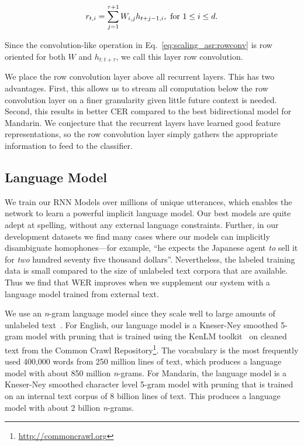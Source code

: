 \begin{align}
\label{eq:scaling_asr:rowconv}
r_{t,i} = \sum_{j=1}^{\tau+1} W_{i,j} h_{t+j-1, i}, {\rm \ for\ } 1 \leq i \leq d.
\end{align}

Since the convolution-like operation in Eq.~\ref{eq:scaling_asr:rowconv} is row
oriented for both $W$ and $h_{t:t+\tau}$, we call this layer row convolution.

We place the row convolution layer above all recurrent layers. This has two
advantages. First, this allows us to stream all computation below the row
convolution layer on a finer granularity given little future context is needed.
Second, this results in better CER compared to the best bidirectional model for
Mandarin. We conjecture that the recurrent layers have learned good feature
representations, so the row convolution layer simply gathers the appropriate
information to feed to the classifier. 


\subsection{Language Model}
\label{sec:scaling_asr:languagemodel}

We train our RNN Models over millions of unique utterances, which enables the
network to learn a powerful implicit language model. Our best models are quite
adept at spelling, without any external language constraints. Further, in our
development datasets we find many cases where our models can implicitly
disambiguate homophones---for example, ``he expects the Japanese agent
\emph{to} sell it for \emph{two} hundred seventy five thousand dollars''.
Nevertheless, the labeled training data is small compared to the size of
unlabeled text corpora that are available. Thus we find that WER improves when
we supplement our system with a language model trained from external text. 

We use an \emph{n}-gram language model since they scale well to large amounts
of unlabeled text~\cite{hannun2014deepspeech}. For English, our language model
is a Kneser-Ney smoothed 5-gram model with pruning that is trained using the
KenLM toolkit~\cite{heafield2013} on cleaned text from the Common Crawl
Repository\footnote{\url{http://commoncrawl.org}}. The vocabulary is the most
frequently used 400,000 words from 250 million lines of text, which produces a
language model with about 850 million \emph{n}-grams. For Mandarin, the
language model is a Kneser-Ney smoothed character level 5-gram model with
pruning that is trained on an internal text corpus of 8 billion lines of text.
This produces a language model with about 2 billion \emph{n}-grams.

